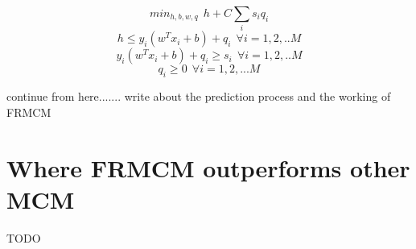\begin{equation}\label{eqn:frmcm1}
min_{h,b,w,q}\:\: h + C\sum_i{s_i q_i}
\end{equation}
\begin{equation}\label{mceqn:frmcm2}
h \leq y_i(w^Tx_i+b)+ q_i \:\:\forall i={1, 2, .. M}
\end{equation}
\begin{equation}\label{eqn:frmcm3}
y_i(w^Tx_i +b) + q_i \geq s_i \:\:\forall i={1,2,.. M}
\end{equation}
\begin{equation}\label{eqn:frmcm4}
q_i \geq 0 \:\:\forall i={1, 2, ... M}
\end{equation}

continue from here.......
write about the prediction process and the working of FRMCM

\section{Where FRMCM outperforms other MCM}
TODO